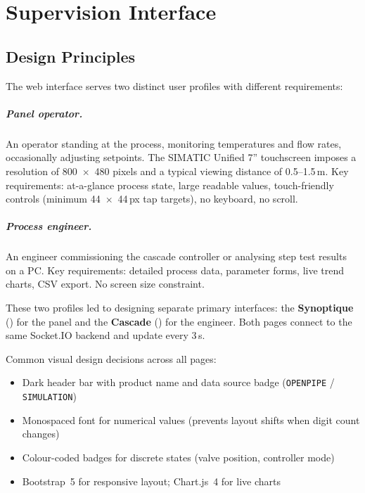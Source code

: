 \chapter{Supervision Interface}

\section{Design Principles}

The web interface serves two distinct user profiles with different requirements:

\paragraph{Panel operator.}
An operator standing at the process, monitoring temperatures and flow rates, occasionally
adjusting setpoints. The SIMATIC Unified 7\textquotedblright{} touchscreen imposes a
resolution of 800~$\times$~480 pixels and a typical viewing distance of 0.5--1.5\,m.
Key requirements: at-a-glance process state, large readable values, touch-friendly controls
(minimum 44~$\times$~44\,px tap targets), no keyboard, no scroll.

\paragraph{Process engineer.}
An engineer commissioning the cascade controller or analysing step test results on a PC.
Key requirements: detailed process data, parameter forms, live trend charts, CSV export.
No screen size constraint.

These two profiles led to designing separate primary interfaces:
the \textbf{Synoptique} () for the panel and
the \textbf{Cascade} () for the engineer.
Both pages connect to the same Socket.IO backend and update every 3\,s.

Common visual design decisions across all pages:
\begin{itemize}[itemsep=3pt]
  \item Dark header bar with product name and data source badge
    (\textcolor{cmtgreen}{\texttt{OPENPIPE}} / \textcolor{orange!80!black}{\texttt{SIMULATION}})
  \item Monospaced font for numerical values (prevents layout shifts when digit count changes)
  \item Colour-coded badges for discrete states (valve position, controller mode)
  \item Bootstrap~5 for responsive layout; Chart.js~4 for live charts
\end{itemize}

